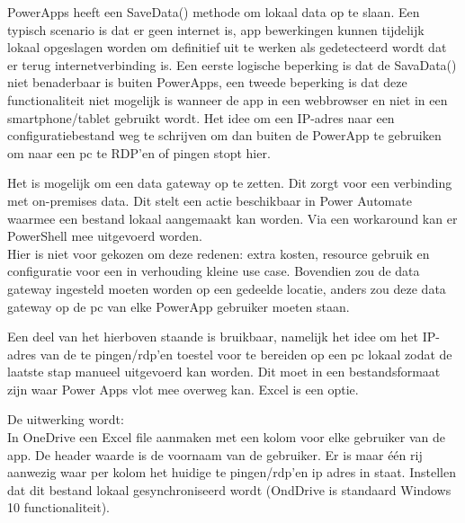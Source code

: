 PowerApps heeft een SaveData() methode om lokaal data op te slaan. Een typisch scenario is dat er geen internet is, app bewerkingen kunnen tijdelijk lokaal opgeslagen worden om definitief uit te werken als gedetecteerd wordt dat er terug internetverbinding is. Een eerste logische beperking is dat de SavaData() niet benaderbaar is buiten PowerApps, een tweede beperking is dat deze functionaliteit niet mogelijk is wanneer de app in een webbrowser en niet in een smartphone/tablet gebruikt wordt. Het idee om een IP-adres naar een configuratiebestand weg te schrijven om dan buiten de PowerApp te gebruiken om naar een pc te RDP'en of pingen stopt hier.

Het is mogelijk om een data gateway op te zetten. Dit zorgt voor een verbinding met on-premises data. Dit stelt een actie beschikbaar in Power Automate waarmee een bestand lokaal aangemaakt kan worden. Via een workaround kan er PowerShell mee uitgevoerd worden. \autocite{Luca2017}\\
Hier is niet voor gekozen om deze redenen: extra kosten, resource gebruik en configuratie voor een in verhouding kleine use case. Bovendien zou de data gateway ingesteld moeten worden op een gedeelde locatie, anders zou deze data gateway op de pc van elke PowerApp gebruiker moeten staan.

Een deel van het hierboven staande is bruikbaar, namelijk het idee om het IP-adres van de te pingen/rdp'en toestel voor te bereiden op een pc lokaal zodat de laatste stap manueel uitgevoerd kan worden. Dit moet in een bestandsformaat zijn waar Power Apps vlot mee overweg kan. Excel is een optie.

De uitwerking wordt:\\
In OneDrive een Excel file aanmaken met een kolom voor elke gebruiker van de app. De header waarde is  de voornaam van de gebruiker. Er is maar één rij aanwezig waar per kolom het huidige te pingen/rdp'en ip adres in staat. Instellen dat dit bestand lokaal gesynchroniseerd wordt (OndDrive is standaard Windows 10 functionaliteit).


